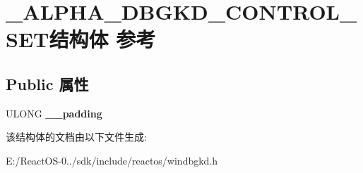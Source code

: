 \hypertarget{struct___a_l_p_h_a___d_b_g_k_d___c_o_n_t_r_o_l___s_e_t}{}\section{\+\_\+\+A\+L\+P\+H\+A\+\_\+\+D\+B\+G\+K\+D\+\_\+\+C\+O\+N\+T\+R\+O\+L\+\_\+\+S\+E\+T结构体 参考}
\label{struct___a_l_p_h_a___d_b_g_k_d___c_o_n_t_r_o_l___s_e_t}
\subsection*{Public 属性}
\begin{DoxyCompactItemize}
\item 
\mbox{\label{struct___a_l_p_h_a___d_b_g_k_d___c_o_n_t_r_o_l___s_e_t_a70ac00caba3a2d8d974c0c283d9771c1}} 
U\+L\+O\+NG {\bfseries \+\_\+\+\_\+padding}
\end{DoxyCompactItemize}


该结构体的文档由以下文件生成\+:\begin{DoxyCompactItemize}
\item 
E\+:/\+React\+O\+S-\/0../sdk/include/reactos/windbgkd.\+h\end{DoxyCompactItemize}
